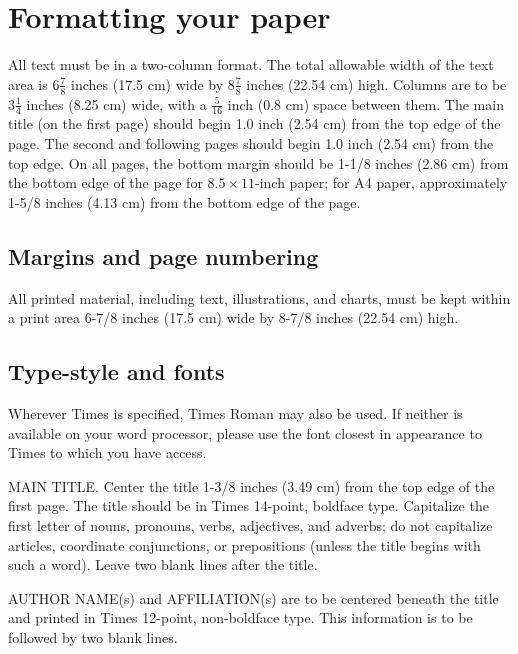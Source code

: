 \documentclass[10pt,twocolumn,letterpaper]{article}
\begin{document}
\section{Formatting your paper}

All text must be in a two-column format. The total allowable width of
the text area is $6\frac78$ inches (17.5 cm) wide by $8\frac78$ inches
(22.54 cm) high. Columns are to be $3\frac14$ inches (8.25 cm) wide,
with a $\frac{5}{16}$ inch (0.8 cm) space between them. The main title
(on the first page) should begin 1.0 inch (2.54 cm) from the top edge
of the page. The second and following pages should begin 1.0 inch
(2.54 cm) from the top edge. On all pages, the bottom margin should be
1-1/8 inches (2.86 cm) from the bottom edge of the page for $8.5
\times 11$-inch paper; for A4 paper, approximately 1-5/8 inches (4.13
cm) from the bottom edge of the page.

\subsection{Margins and page numbering}

All printed material, including text, illustrations, and charts, must
be kept within a print area 6-7/8 inches (17.5 cm) wide by 8-7/8
inches (22.54 cm) high.


\subsection{Type-style and fonts}

Wherever Times is specified, Times Roman may also be used. If neither
is available on your word processor, please use the font closest in
appearance to Times to which you have access.

MAIN TITLE. Center the title 1-3/8 inches (3.49 cm) from the top edge
of the first page. The title should be in Times 14-point, boldface
type.  Capitalize the first letter of nouns, pronouns, verbs,
adjectives, and adverbs; do not capitalize articles, coordinate
conjunctions, or prepositions (unless the title begins with such a
word). Leave two blank lines after the title.

AUTHOR NAME(s) and AFFILIATION(s) are to be centered beneath the title
and printed in Times 12-point, non-boldface type. This information is
to be followed by two blank lines.
\end{document}
